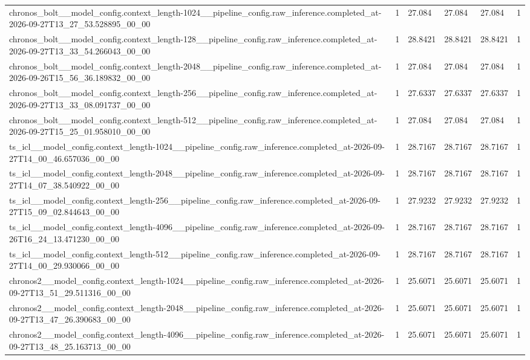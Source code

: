 \begin{tabular}{llllll}
chronos\_bolt\_\_model\_config.context\_length-1024\_\_pipeline\_config.raw\_inference.completed\_at-2026-09-27T13\_27\_53.528895\_00\_00 & 1 & 27.084 & 27.084 & 27.084 & 1 \\
chronos\_bolt\_\_model\_config.context\_length-128\_\_pipeline\_config.raw\_inference.completed\_at-2026-09-27T13\_33\_54.266043\_00\_00 & 1 & 28.8421 & 28.8421 & 28.8421 & 1 \\
chronos\_bolt\_\_model\_config.context\_length-2048\_\_pipeline\_config.raw\_inference.completed\_at-2026-09-26T15\_56\_36.189832\_00\_00 & 1 & 27.084 & 27.084 & 27.084 & 1 \\
chronos\_bolt\_\_model\_config.context\_length-256\_\_pipeline\_config.raw\_inference.completed\_at-2026-09-27T13\_33\_08.091737\_00\_00 & 1 & 27.6337 & 27.6337 & 27.6337 & 1 \\
chronos\_bolt\_\_model\_config.context\_length-512\_\_pipeline\_config.raw\_inference.completed\_at-2026-09-27T15\_25\_01.958010\_00\_00 & 1 & 27.084 & 27.084 & 27.084 & 1 \\
ts\_icl\_\_model\_config.context\_length-1024\_\_pipeline\_config.raw\_inference.completed\_at-2026-09-27T14\_00\_46.657036\_00\_00 & 1 & 28.7167 & 28.7167 & 28.7167 & 1 \\
ts\_icl\_\_model\_config.context\_length-2048\_\_pipeline\_config.raw\_inference.completed\_at-2026-09-27T14\_07\_38.540922\_00\_00 & 1 & 28.7167 & 28.7167 & 28.7167 & 1 \\
ts\_icl\_\_model\_config.context\_length-256\_\_pipeline\_config.raw\_inference.completed\_at-2026-09-27T15\_09\_02.844643\_00\_00 & 1 & 27.9232 & 27.9232 & 27.9232 & 1 \\
ts\_icl\_\_model\_config.context\_length-4096\_\_pipeline\_config.raw\_inference.completed\_at-2026-09-26T16\_24\_13.471230\_00\_00 & 1 & 28.7167 & 28.7167 & 28.7167 & 1 \\
ts\_icl\_\_model\_config.context\_length-512\_\_pipeline\_config.raw\_inference.completed\_at-2026-09-27T14\_00\_29.930066\_00\_00 & 1 & 28.7167 & 28.7167 & 28.7167 & 1 \\
chronos2\_\_model\_config.context\_length-1024\_\_pipeline\_config.raw\_inference.completed\_at-2026-09-27T13\_51\_29.511316\_00\_00 & 1 & 25.6071 & 25.6071 & 25.6071 & 1 \\
chronos2\_\_model\_config.context\_length-2048\_\_pipeline\_config.raw\_inference.completed\_at-2026-09-27T13\_47\_26.390683\_00\_00 & 1 & 25.6071 & 25.6071 & 25.6071 & 1 \\
chronos2\_\_model\_config.context\_length-4096\_\_pipeline\_config.raw\_inference.completed\_at-2026-09-27T13\_48\_25.163713\_00\_00 & 1 & 25.6071 & 25.6071 & 25.6071 & 1 \\

\end{tabular}
